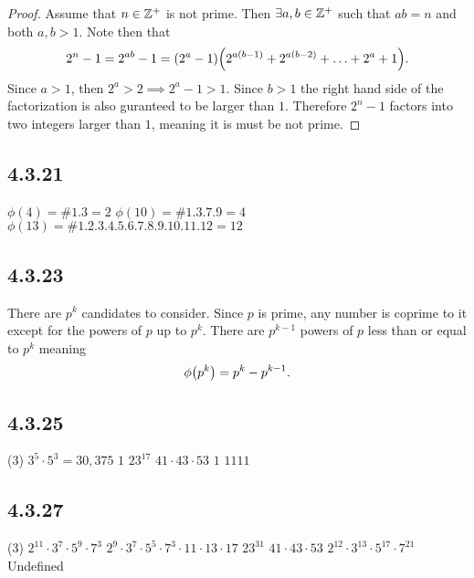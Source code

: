 \documentclass[12pt,titlepage]{extarticle}
\begin{document}
\begin{proof}
    Assume that $n \in \mathbb{Z}^+$ is not prime. Then $\exists a,b \in \mathbb{Z}^+$ such that $ab = n$ and both $a,b > 1$. Note then that
    \[
    2^n - 1 = 2^{ab} - 1 = \qty(2^a - 1) \qty(2^{a(b-1)} + 2^{a(b-2)} + \ldots + 2^a + 1)
    .\]
    Since $a > 1$, then $2^a > 2 \implies 2^a - 1 > 1$. Since $b > 1$ the right hand side of the factorization is also guranteed to be larger than $1$. Therefore $2^n - 1$ factors into two integers larger than $1$, meaning it is must be not prime.
\end{proof}

\subsection*{4.3.21}
\begin{tasks}
    \task $\phi(4) = \#\qty{1,3} = 2$
    \task $\phi(10) = \#\qty{1,3,7,9} = 4$
    \task $\phi(13) = \#\qty{1,2,3,4,5,6,7,8,9,10,11,12} = 12$
\end{tasks}

\subsection*{4.3.23}
There are $p^k$ candidates to consider. Since $p$ is prime, any number is coprime to it except for the powers of $p$ up to $p^k$. There are $p^{k-1}$ powers of $p$ less than or equal to $p^k$ meaning
\[
    \phi\qty(p^k) = p^k - p^{k-1}
.\]

\subsection*{4.3.25}
\begin{tasks}(3)
    \task $3^5 \cdot 5^3 = 30,375$
    \task $1$
    \task $23^{17}$
    \task $41 \cdot 43 \cdot 53$
    \task $1$
    \task $1111$
\end{tasks}

\subsection*{4.3.27}
\begin{tasks}(3)
    \task $2^{11} \cdot 3^7 \cdot 5^9 \cdot 7^3$
    \task $2^9 \cdot 3^7 \cdot 5^5 \cdot 7^3 \cdot 11 \cdot 13 \cdot 17$
    \task $23^{31}$
    \task $41 \cdot 43 \cdot 53$
    \task $2^{12} \cdot 3^{13} \cdot 5^{17} \cdot 7^{21}$
    \task Undefined
\end{tasks}
\end{document}
